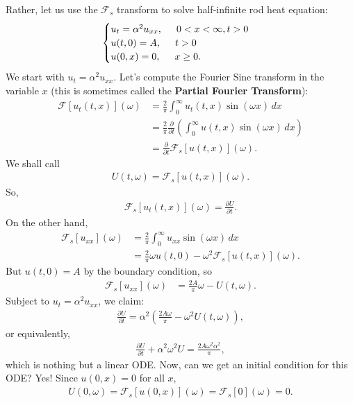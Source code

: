 \documentclass{book}
\theoremstyle{definition}
\newcommand{\p}{\partial}
\newcommand{\F}{\mathcal{F}}
\begin{document}
Rather, let us use the $\F_s$ transform to solve half-infinite rod heat equation:
\begin{align*}
\begin{cases}
u_t = \alpha^2 u_{xx}, \hspace{0.5cm}0 < x < \infty, t> 0\\
u(t,0) = A, \hspace{0.5cm} t> 0\\
u(0,x) = 0, \hspace{0.5cm} x\geq 0.
\end{cases}
\end{align*}
We start with $u_t = \alpha^2 u_{xx}$. Let's compute the Fourier Sine transform in the variable $x$ (this is sometimes called the \textbf{Partial Fourier Transform}):
\begin{align*}
\F[u_t(t,x)](\omega) &= \frac{2}{\pi}\int^\infty_0 u_t(t,x)\sin(\omega x)\,dx\\
&= \frac{2}{\pi}\frac{\p}{\p t}\left(\int^\infty_0 u(t,x)\sin(\omega x)\,dx  \right)\\
&= \frac{\p}{\p t}\F_s[u(t,x)](\omega).
\end{align*}
We shall call
\begin{align*}
U(t,\omega) = \F_s[u(t,x)](\omega).
\end{align*}
So,
\begin{align*}
\F_s[u_t(t,x)](\omega) = \frac{\p U}{\p t}.
\end{align*}
On the other hand,
\begin{align*}
\F_s[u_{xx}](\omega) &= \frac{2}{\pi}\int^\infty_0 u_{xx}\sin(\omega x)\,dx\\
&= \frac{2}{\pi}\omega u(t,0) - \omega^2 \F_s[u(t,x)](\omega).
\end{align*}
But $u(t,0) = A$ by the boundary condition, so
\begin{align*}
\F_s[u_{xx}](\omega) &= \frac{2A}{\pi}\omega - U(t,\omega).
\end{align*}
Subject to $u_t = \alpha^2 u_{xx}$, we claim:
\begin{align*}
\frac{\p U}{\p t} = \alpha^2\left( \frac{2A\omega}{\pi} - \omega^2U(t,\omega) \right),
\end{align*}
or equivalently,
\begin{align*}
\frac{\p U}{\p t} + \alpha^2\omega^2 U = \frac{2A\omega^2\alpha^2}{\pi}, 
\end{align*}
which is nothing but a linear ODE. Now, can we get an initial condition for this ODE? Yes! Since $u(0,x) = 0$ for all $x$,
\begin{align*}
U(0, \omega) = \F_s[u(0,x)](\omega) = \F_s[0](\omega) = 0.
\end{align*}
\end{document}
